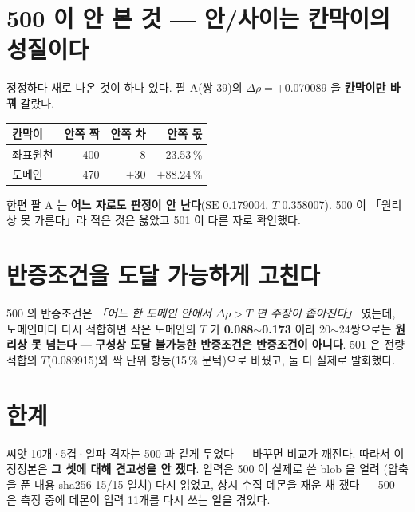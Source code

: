 \documentclass[10pt]{article}
\begin{document}
\section{500 이 안 본 것 --- 안/사이는 칸막이의 성질이다}

정정하다 새로 나온 것이 하나 있다. 팔 A(쌍 39)의 $\Delta\rho=+$0.070089 을
\textbf{칸막이만 바꿔} 갈랐다.

\begin{center}\small
\begin{tabular}{lrrr}
\toprule
칸막이 & 안쪽 짝 & 안쪽 차 & 안쪽 몫 \\
\midrule
좌표원천 & 400 & $-$8  & $-$23.53\,\% \\
도메인   & 470 & $+$30 & $+$88.24\,\% \\
\bottomrule
\end{tabular}
\end{center}


한편 팔 A 는 \textbf{어느 자로도 판정이 안 난다}($\mathrm{SE}$ 0.179004,
$T$ 0.358007). 500 이 「원리상 못 가른다」라 적은 것은 옳았고 501 이 다른 자로 확인했다.

\section{반증조건을 도달 가능하게 고친다}

500 의 반증조건은 \emph{「어느 한 도메인 안에서 $\Delta\rho>T$ 면 주장이 좁아진다」}
였는데, 도메인마다 다시 적합하면 작은 도메인의 $T$ 가 \textbf{0.088$\sim$0.173} 이라
20$\sim$24쌍으로는 \textbf{원리상 못 넘는다} --- \textbf{구성상 도달 불가능한 반증조건은
반증조건이 아니다}. 501 은 전량 적합의 $T$(0.089915)와 짝 단위 항등(15\,\% 문턱)으로
바꿨고, 둘 다 실제로 발화했다.

\section{한계}

씨앗 10개·5겹·알파 격자는 500 과 같게 두었다 --- 바꾸면 비교가 깨진다. 따라서 이 정정본은
\textbf{그 셋에 대해 견고성을 안 쟀다}. 입력은 500 이 실제로 쓴 blob 을 얼려
(압축을 푼 내용 sha256 15/15 일치) 다시 읽었고, 상시 수집 데몬을 재운 채 쟀다 ---
500 은 측정 중에 데몬이 입력 11개를 다시 쓰는 일을 겪었다.
\end{document}
